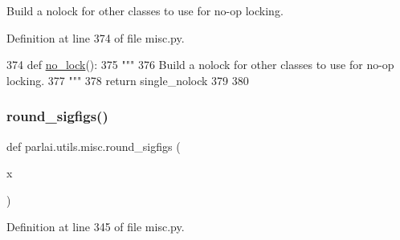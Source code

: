 \begin{DoxyVerb}Build a nolock for other classes to use for no-op locking.
\end{DoxyVerb}
 

Definition at line 374 of file misc.\+py.


\begin{DoxyCode}
374 \textcolor{keyword}{def }\hyperlink{namespaceparlai_1_1utils_1_1misc_a38a23cfa0fc3dbed42846787d1c04b57}{no\_lock}():
375     \textcolor{stringliteral}{"""}
376 \textcolor{stringliteral}{    Build a nolock for other classes to use for no-op locking.}
377 \textcolor{stringliteral}{    """}
378     \textcolor{keywordflow}{return} single\_nolock
379 
380 
\end{DoxyCode}
\mbox{\label{namespaceparlai_1_1utils_1_1misc_a85b4447d47998393aaca2c83660f096e}} 
\subsubsection{\texorpdfstring{round\+\_\+sigfigs()}{round\_sigfigs()}}
{\footnotesize\ttfamily def parlai.\+utils.\+misc.\+round\+\_\+sigfigs (\begin{DoxyParamCaption}\item[{}]{x }\end{DoxyParamCaption})}



Definition at line 345 of file misc.\+py.


